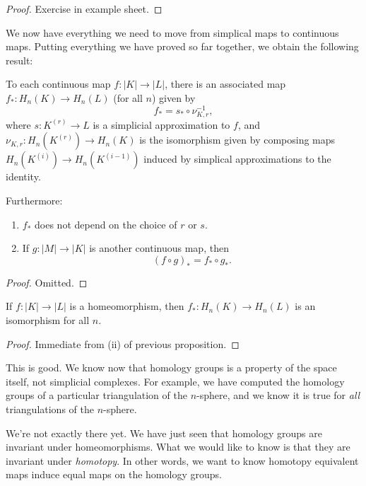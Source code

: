 \documentclass[a4paper]{article}
\begin{document}
\begin{proof}
  Exercise in example sheet.
\end{proof}

We now have everything we need to move from simplical maps to continuous maps. Putting everything we have proved so far together, we obtain the following result:

\begin{prop}
  To each continuous map $f: |K| \to |L|$, there is an associated map $f_*: H_n(K) \to H_n(L)$ (for all $n$) given by
  \[
    f_* = s_* \circ \nu_{K, r}^{-1},
  \]
  where $s: K^{(r)} \to L$ is a simplicial approximation to $f$, and $\nu_{K, r}: H_n (K^{(r)}) \to H_n(K)$ is the isomorphism given by composing maps $H_n(K^{(i)}) \to H_n(K^{(i - 1)})$ induced by simplical approximations to the identity.

  Furthermore:
  \begin{enumerate}
    \item $f_*$ does not depend on the choice of $r$ or $s$.
    \item If $g: |M| \to |K|$ is another continuous map, then
      \[
        (f \circ g)_* = f_* \circ g_*.
      \]
  \end{enumerate}
\end{prop}

\begin{proof}
  Omitted.
\end{proof}

\begin{cor}
  If $f: |K| \to |L|$ is a homeomorphism, then $f_*: H_n(K) \to H_n(L)$ is an isomorphism for all $n$.
\end{cor}

\begin{proof}
  Immediate from (ii) of previous proposition.
\end{proof}

This is good. We know now that homology groups is a property of the space itself, not simplicial complexes. For example, we have computed the homology groups of a particular triangulation of the $n$-sphere, and we know it is true for \emph{all} triangulations of the $n$-sphere.

We're not exactly there yet. We have just seen that homology groups are invariant under homeomorphisms. What we would like to know is that they are invariant under \emph{homotopy}. In other words, we want to know homotopy equivalent maps induce equal maps on the homology groups.
\end{document}
